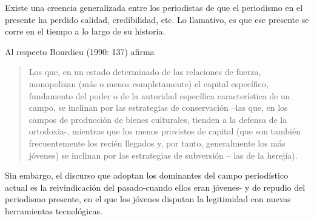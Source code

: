 Existe una creencia generalizada entre los periodistas de que el periodismo en el presente ha perdido calidad, credibilidad, etc. Lo llamativo, es que ese presente se corre en el tiempo a lo largo de su historia.

Al respecto Bourdieu (1990: 137) afirma

\begin{quote}
Los que, en un estado determinado de las relaciones de fuerza, monopolizan (más o menos completamente) el capital específico, fundamento del poder o de la autoridad específica característica de un campo, se inclinan por las estrategias de conservación --las que, en los campos de producción de bienes culturales, tienden a la defensa de la ortodoxia-, mientras que los menos provistos de capital (que son también frecuentemente los recién llegados y, por tanto, generalmente los más jóvenes) se inclinan por las estrategias de subversión -- las de la herejía).
\end{quote}

Sin embargo, el discurso que adoptan los dominantes del campo periodístico actual es la reivindicación del pasado-cuando ellos eran jóvenes- y de repudio del periodismo presente, en el que los jóvenes disputan la legitimidad con nuevas herramientas tecnológicas.

